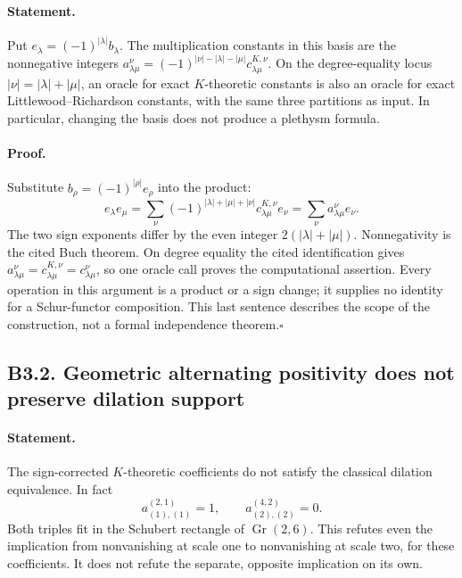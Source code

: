 \documentclass[11pt,a4paper]{article}
\begin{document}
\paragraph{Statement.}
Put $e_\lambda=(-1)^{|\lambda|}b_\lambda$.  The multiplication constants
in this basis are the nonnegative integers
$a_{\lambda\mu}^{\nu}=(-1)^{|\nu|-|\lambda|-|\mu|}
c^{K,\nu}_{\lambda\mu}$.  On the degree-equality locus
$|\nu|=|\lambda|+|\mu|$, an oracle for exact $K$-theoretic constants is
also an oracle for exact Littlewood--Richardson constants, with the same
three partitions as input.  In particular, changing the basis does not
produce a plethysm formula.
\paragraph{Proof.}
Substitute $b_\rho=(-1)^{|\rho|}e_\rho$ into the product:
\[
 e_\lambda e_\mu
 =\sum_\nu(-1)^{|\lambda|+|\mu|+|\nu|}
      c^{K,\nu}_{\lambda\mu}e_\nu
 =\sum_\nu a_{\lambda\mu}^{\nu}e_\nu.
\]
The two sign exponents differ by the even integer
$2(|\lambda|+|\mu|)$.  Nonnegativity is the cited Buch theorem.
On degree equality the cited identification gives
$a_{\lambda\mu}^{\nu}=c^{K,\nu}_{\lambda\mu}=c_{\lambda\mu}^{\nu}$,
so one oracle call proves the computational assertion.  Every operation
in this argument is a product or a sign change; it supplies no identity
for a Schur-functor composition.  This last sentence describes the scope
of the construction, not a formal independence theorem.\hfill$\square$

\subsection*{B3.2. Geometric alternating positivity does not preserve dilation support}
\paragraph{Statement.}
The sign-corrected $K$-theoretic coefficients do not satisfy the classical
dilation equivalence.  In fact
\[
 a_{(1),(1)}^{(2,1)}=1,
 \qquad a_{(2),(2)}^{(4,2)}=0.
\]
Both triples fit in the Schubert rectangle of $\operatorname{Gr}(2,6)$.
This refutes even the implication from nonvanishing at scale one to
nonvanishing at scale two, for these coefficients.  It does not refute
the separate, opposite implication on its own.
\end{document}
